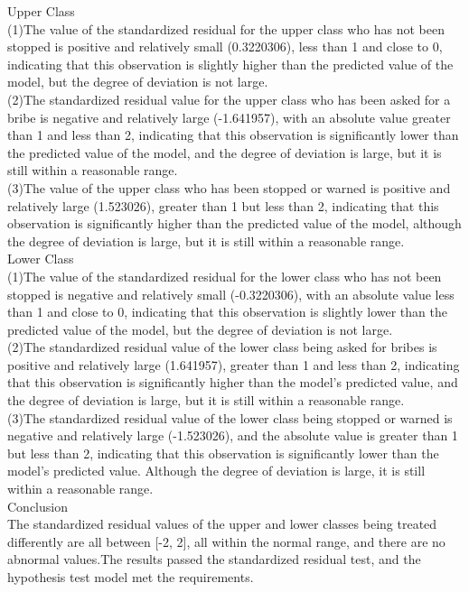 \documentclass[12pt,letterpaper]{article}
\begin{document}
\begin{enumerate}
	Upper Class\\
	(1)The value of the standardized residual for the upper class who has not been stopped is positive and relatively small (0.3220306), less than 1 and close to 0, indicating that this observation is slightly higher than the predicted value of the model, but the degree of deviation is not large.\\
	(2)The standardized residual value for the upper class who has been asked for a bribe is negative and relatively large (-1.641957), with an absolute value greater than 1 and less than 2, indicating that this observation is significantly lower than the predicted value of the model, and the degree of deviation is large, but it is still within a reasonable range.\\
	(3)The value of the upper class who has been stopped or warned is positive and relatively large (1.523026), greater than 1 but less than 2, indicating that this observation is significantly higher than the predicted value of the model, although the degree of deviation is large, but it is still within a reasonable range.\\
	Lower Class\\
	(1)The value of the standardized residual for the lower class who has not been stopped is negative and relatively small (-0.3220306), with an absolute value less than 1 and close to 0, indicating that this observation is slightly lower than the predicted value of the model, but the degree of deviation is not large.\\
	(2)The standardized residual value of the lower class being asked for bribes is positive and relatively large (1.641957), greater than 1 and less than 2, indicating that this observation is significantly higher than the model's predicted value, and the degree of deviation is large, but it is still within a reasonable range.\\
	(3)The standardized residual value of the lower class being stopped or warned is negative and relatively large (-1.523026), and the absolute value is greater than 1 but less than 2, indicating that this observation is significantly lower than the model's predicted value. Although the degree of deviation is large, it is still within a reasonable range.\\
	
	Conclusion\\
	The standardized residual values of the upper and lower classes being treated differently are all between [-2, 2], all within the normal range, and there are no abnormal values.The results passed the standardized residual test, and the hypothesis test model met the requirements.\\
\end{enumerate}
\newpage
\end{document}
